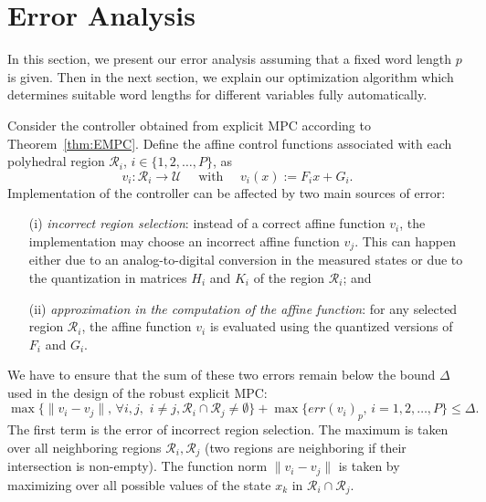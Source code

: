 \section{Error Analysis}
\label{sec:Error_Analysis}

In this section, we present our error analysis assuming that a fixed word length $p$ is given.
Then in the next section, we explain our optimization algorithm which determines suitable word
lengths for different variables fully automatically. %
%

Consider the controller obtained from explicit MPC according to Theorem~\ref{thm:EMPC}.
Define the affine control functions associated with each polyhedral region $\mathcal R_i$, $i\in\{1,2,\ldots, P\}$, as
$$v_{i}:\mathcal R_i\rightarrow \mathcal U \quad \text{ with } \quad v_{i}(x) := F_i x + G_i.$$
Implementation of the controller can be affected by two main sources of
error:
\begin{itemize}
  \item[(i)] \emph{incorrect region selection}:
   instead of a correct affine function $v_{i}$, the implementation may choose an incorrect affine function $v_{j}$. This can happen either
    due to an analog-to-digital conversion in the measured states or due to the quantization in matrices $H_i$ and $K_i$ of the region $\mathcal R_i$; and
    
  \item[(ii)] \emph{approximation in the computation of the affine function}: for any selected region $\mathcal R_i$, the affine function $v_{i}$ is evaluated using the quantized versions of $F_i$ and $G_i$.
\end{itemize}

We have to ensure that the sum of these two errors remain below the bound $\Delta$
used in the design of the robust explicit MPC:
\begin{equation}
  \max\{\|v_{i}-v_{j}\|,\,\forall i,j,\,\, i\neq j, \mathcal{R}_{i}\cap\mathcal{R}_{j}\neq\emptyset\} +  \max\{\mathit{err}(v_{i})_{p},\, i=1,2,\ldots,P\} \le \Delta.
  \label{eq:delta}
\end{equation}
The first term is the error of incorrect region selection. The maximum is taken over all neighboring regions 
$\mathcal R_i,\mathcal R_j$ (two regions are neighboring if their intersection is non-empty).
The function norm $\|v_{i}-v_{j}\|$ is taken by maximizing over all possible values of the state $x_k$ %
in $\mathcal{R}_i \cap \mathcal{R}_j$.%

